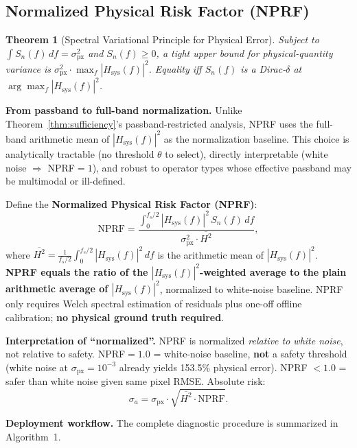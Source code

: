 \documentclass[9pt,twocolumn]{article}
\newtheorem{theorem}[proposition]{Theorem}
\theoremstyle{remark}
\theoremstyle{definition}
\newcommand{\pxrmse}{\sigma_{\text{px}}}
\newcommand{\nprf}{\text{NPRF}}
\newcommand{\snf}{S_n(f)}
\newcommand{\hsysf}{|H_{\text{sys}}(f)|^2}
\newcommand{\Hsqmean}{\overline{H^2}}
\begin{document}
\subsection{Normalized Physical Risk Factor (NPRF)}

\begin{theorem}[Spectral Variational Principle for Physical Error]
\label{thm:variational}
Subject to $\int \snf \, df = \pxrmse^2$ and $\snf \geq 0$, a tight upper bound for physical-quantity variance is $\pxrmse^2 \cdot \max_f \hsysf$. Equality iff $\snf$ is a Dirac-$\delta$ at $\arg\max_f \hsysf$.
\end{theorem}

\textbf{From passband to full-band normalization.} Unlike Theorem~\ref{thm:sufficiency}'s passband-restricted analysis, NPRF uses the full-band arithmetic mean of $\hsysf$ as the normalization baseline. This choice is analytically tractable (no threshold $\theta$ to select), directly interpretable (white noise $\Rightarrow$ NPRF$=1$), and robust to operator types whose effective passband may be multimodal or ill-defined.

Define the \textbf{Normalized Physical Risk Factor (NPRF)}:
\begin{equation}
\label{eq:nprf_def}
\nprf = \frac{\int_{0}^{f_s/2} \hsysf \,\snf \, df}{\pxrmse^2 \cdot \Hsqmean},
\end{equation}
where $\Hsqmean = \frac{1}{f_s/2}\int_{0}^{f_s/2} \hsysf \, df$ is the arithmetic mean of $\hsysf$. \textbf{NPRF equals the ratio of the $\hsysf$-weighted average to the plain arithmetic average of $\hsysf$}, normalized to white-noise baseline. NPRF only requires Welch spectral estimation\cite{welch1967} of residuals plus one-off offline calibration; \textbf{no physical ground truth required}.

\textbf{Interpretation of ``normalized''.} NPRF is normalized \textit{relative to white noise}, not relative to safety. NPRF$=1.0$ = white-noise baseline, \textbf{not} a safety threshold (white noise at $\sigma_{\text{px}}=10^{-3}$ already yields 153.5\% physical error). NPRF $<1.0$ = safer than white noise given same pixel RMSE. Absolute risk:
\begin{equation}
\label{eq:decomposition}
\sigma_a = \pxrmse \cdot \sqrt{\Hsqmean \cdot \nprf}.
\end{equation}

\textbf{Deployment workflow.} The complete diagnostic procedure is summarized in Algorithm~1.
\end{document}
